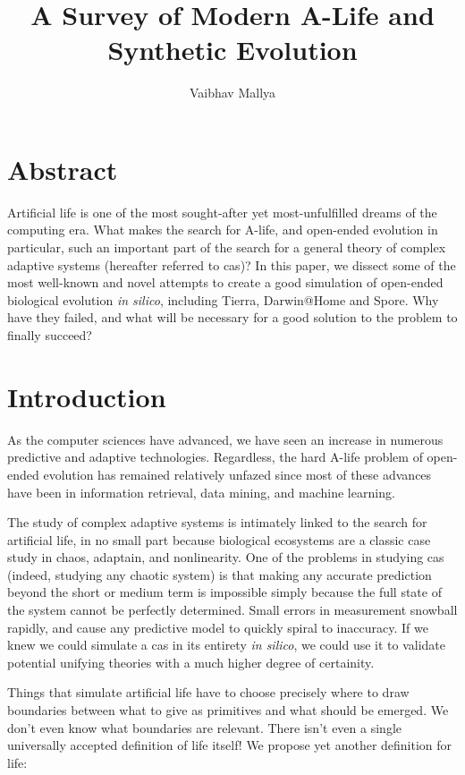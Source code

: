 \documentclass{article}
\begin{document}
\title{A Survey of Modern A-Life and Synthetic Evolution}
\author{Vaibhav Mallya}
\maketitle
\section{Abstract}

Artificial life is one of the most sought-after yet most-unfulfilled dreams of the computing era. What makes the search for A-life, and open-ended evolution in particular, such an important part of the search for a general theory of complex adaptive systems (hereafter referred to cas)? In this paper, we dissect some of the most well-known and novel attempts to create a good simulation of open-ended biological evolution \emph{in silico}, including Tierra, Darwin@Home and Spore. Why have they failed, and what will be necessary for a good solution to the problem to finally succeed?

\section{Introduction}
As the computer sciences have advanced, we have seen an increase in numerous predictive and adaptive technologies. Regardless, the hard A-life problem of open-ended evolution has remained relatively unfazed since most of these advances have been in information retrieval, data mining, and machine learning.

The study of complex adaptive systems is intimately linked to the search for artificial life, in no small part because biological ecosystems are a classic case study in chaos, adaptain, and nonlinearity. One of the problems in studying cas (indeed, studying any chaotic system) is that making any accurate prediction beyond the short or medium term is impossible simply because the full state of the system cannot be perfectly determined. Small errors in measurement snowball rapidly, and cause any predictive model to quickly spiral to inaccuracy. If we knew we could simulate a cas in its entirety \emph{in silico}, we could use it to validate potential unifying theories with a much higher degree of certainity.

Things that simulate artificial life have to choose precisely where to draw boundaries between what to give as primitives and what should be emerged. We don't even know what boundaries are relevant. There isn't even a single universally accepted definition of life itself! We propose yet another definition for life:
\end{document}
